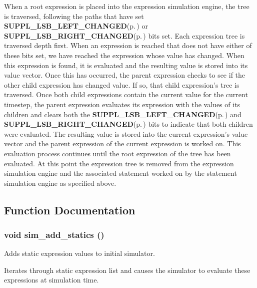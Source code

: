 \begin{Desc}
\item[]When a root expression is placed into the expression simulation engine, the tree is traversed, following the paths that have set {\bf SUPPL\_\-LSB\_\-LEFT\_\-CHANGED}{\rm (p.\,\pageref{group__expr__suppl_a9})} or {\bf SUPPL\_\-LSB\_\-RIGHT\_\-CHANGED}{\rm (p.\,\pageref{group__expr__suppl_a10})} bits set. Each expression tree is traversed depth first. When an expression is reached that does not have either of these bits set, we have reached the expression whose value has changed. When this expression is found, it is evaluated and the resulting value is stored into its value vector. Once this has occurred, the parent expression checks to see if the other child expression has changed value. If so, that child expression's tree is traversed. Once both child expressions contain the current value for the current timestep, the parent expression evaluates its expression with the values of its children and clears both the {\bf SUPPL\_\-LSB\_\-LEFT\_\-CHANGED}{\rm (p.\,\pageref{group__expr__suppl_a9})} and {\bf SUPPL\_\-LSB\_\-RIGHT\_\-CHANGED}{\rm (p.\,\pageref{group__expr__suppl_a10})} bits to indicate that both children were evaluated. The resulting value is stored into the current expression's value vector and the parent expression of the current expression is worked on. This evaluation process continues until the root expression of the tree has been evaluated. At this point the expression tree is removed from the expression simulation engine and the associated statement worked on by the statement simulation engine as specified above.\end{Desc}


\subsection{Function Documentation}
\subsubsection{\setlength{\rightskip}{0pt plus 5cm}void sim\_\-add\_\-statics ()}\label{sim_8c_a8}


Adds static expression values to initial simulator. 

Iterates through static expression list and causes the simulator to evaluate these expressions at simulation time. 

